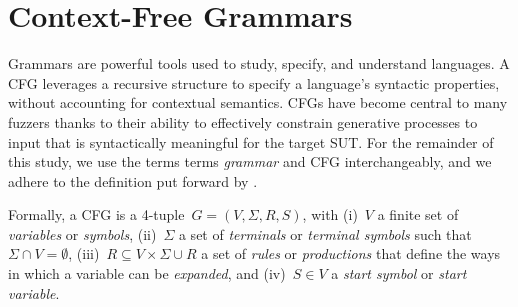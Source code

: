 
\section{Context-Free Grammars}

Grammars are powerful tools used to study, specify,
and understand languages. 
A \Gls{CFG} leverages a recursive structure to
specify a language's syntactic properties, without accounting for
contextual semantics.
\gls{CFG}s have become central to many fuzzers thanks to their ability 
to effectively constrain generative processes to
input that is syntactically meaningful for the target \gls{SUT}.
For the remainder of this study, we use the terms terms \textit{grammar} 
and \gls{CFG} interchangeably, and we adhere to the definition put forward
by \citet{sipser1996introduction}.

Formally, a \gls{CFG} is a 4-tuple~$G=(V, \Sigma, R, S)$,
with (i)~$V$ a finite set of \textit{variables} or \textit{symbols},
(ii)~$\Sigma$ a set of \textit{terminals} or \textit{terminal symbols} 
such that $\Sigma \cap V = \emptyset$,
(iii)~$R \subseteq V \times \Sigma \cup R$
a set of \textit{rules} or \textit{productions} that define the ways in which a variable can be \textit{expanded}, and (iv)~$S \in V$ a \textit{start symbol} or \textit{start variable}.

